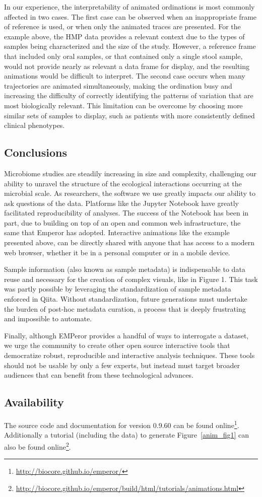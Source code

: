 In our experience, the interpretability of animated ordinations is most commonly affected in two cases. The first case can be observed when an inappropriate frame of reference is used, or when only the animated traces are presented. For the example above, the HMP data provides a relevant context due to the types of samples being characterized and the size of the study. However, a reference frame that included only oral samples, or that contained only a single stool sample, would not provide nearly as relevant a data frame for display, and the resulting animations would be difficult to interpret. The second case occurs when many trajectories are animated simultaneously, making the ordination busy and increasing the difficulty of correctly identifying the patterns of variation that are most biologically relevant. This limitation can be overcome by choosing more similar sets of samples to display, such as patients with more consistently defined clinical phenotypes.

\subsection{Conclusions}
Microbiome studies are steadily increasing in size and complexity, challenging our ability to unravel the structure of the ecological interactions occurring at the  microbial scale. As researchers, the software we use greatly impacts our ability to ask questions of the data. Platforms like the Jupyter Notebook have greatly facilitated reproducibility of analyses.  The success of the Notebook has been in part, due to building on top of an open and common web infrastructure, the same that Emperor has adopted. Interactive animations like the example presented above, can be directly shared with anyone that has access to a modern web browser, whether it be in a personal computer or in a mobile device.

Sample information (also known as sample metadata) is indispensable to data reuse and necessary for the creation of complex visuals, like in Figure 1. This task was partly possible by leveraging the standardization of sample metadata enforced in Qiita. Without standardization, future generations must undertake the burden of post-hoc metadata curation, a process that is deeply frustrating and impossible to automate.

Finally, although EMPeror provides a handful of ways to interrogate a dataset, we urge the community to create other open source interactive tools that democratize robust, reproducible and interactive analysis techniques. These tools should not be usable by only a few experts, but instead must target broader audiences that can benefit from these technological advances.

\subsection{Availability}
The source code and documentation for version 0.9.60 can be found online\footnote{\url{http://biocore.github.io/emperor/}}. Additionally a tutorial (including the data) to generate Figure~\ref{anim_fig1} can also be found online\footnote{\url{http://biocore.github.io/emperor/build/html/tutorials/animations.html}}. 

